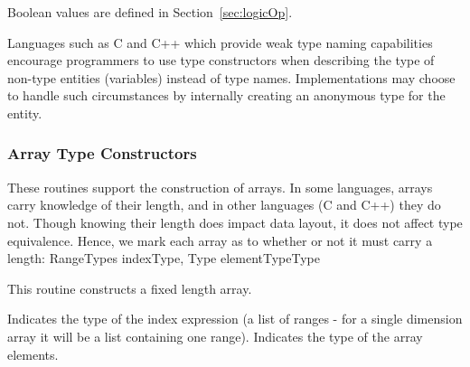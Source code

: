 \begin{functionality}
Boolean values are defined in Section~\ref{sec:logicOp}.
\end{functionality}


		




Languages such as C and C++ which provide weak type naming
capabilities encourage programmers to use type constructors when
describing the type of non-type entities (\eg variables) instead of
type names.  Implementations may choose to handle such circumstances
by internally creating an anonymous type for the entity.  

\subsubsection{Array Type Constructors}
These routines support the construction of arrays.  In some languages,
arrays carry knowledge of their length, and in other languages (\eg C
and C++) they do not.  Though knowing their length does impact data
layout, it does not affect type equivalence.  Hence, we mark each
array as to whether or not it must carry a length:
	{RangeTypes indexType, Type elementType}{Type}
\begin{functionality}
This routine constructs a fixed length array.
\begin{Parameters}
 Indicates the type of the index expression 
(a list of ranges - for a single dimension array it will be a list
containing one range).
 Indicates the type of the array elements.
\end{Parameters}
\end{functionality}


